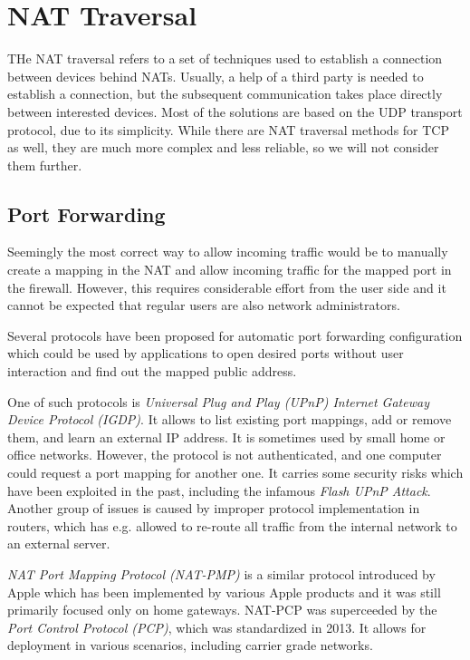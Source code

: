 \section{NAT Traversal}

THe NAT traversal refers to a set of techniques used to establish a connection between devices behind NATs. Usually, a help of a third party is needed to establish a connection, but the subsequent communication takes place directly between interested devices.
Most of the solutions are based on the UDP transport protocol, due to its simplicity. While there are NAT traversal methods for TCP as well, they are much more complex and less reliable, so we will not consider them further.

\subsection{Port Forwarding}

Seemingly the most correct way to allow incoming traffic would be to manually create a mapping in the NAT and allow incoming traffic for the mapped port in the firewall. However, this requires considerable effort from the user side and it cannot be expected that regular users are also network administrators.

Several protocols have been proposed for automatic port forwarding configuration which could be used by applications to open desired ports without user interaction and find out the mapped public address.

One of such protocols is \textit{Universal Plug and Play (UPnP) Internet Gateway Device Protocol (IGDP)}. It allows to list existing port mappings, add or remove them, and learn an external IP address. It is sometimes used by small home or office networks. However, the protocol is not authenticated, and one computer could request a port mapping for another one. It carries some security risks which have been exploited in the past, including the infamous \textit{Flash UPnP Attack}. Another group of issues is caused by improper protocol implementation in routers, which has e.g. allowed to re-route all traffic from the internal network to an external server. \cite{upnpbugs}

\textit{NAT Port Mapping Protocol (NAT-PMP)} is a similar protocol introduced by Apple which has been implemented by various Apple products and it was still primarily focused only on home gateways. NAT-PCP was superceeded by the \textit{Port Control Protocol (PCP)}, which was standardized in 2013. \cite{pcp} It allows for deployment in various scenarios, including carrier grade networks.

